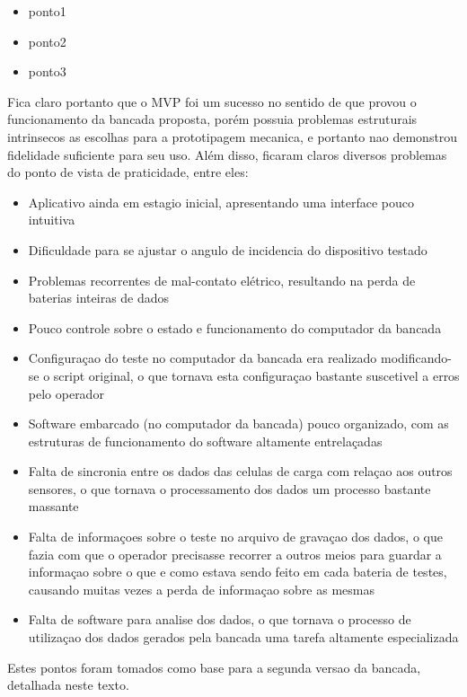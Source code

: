 \begin{itemize}
    \item ponto1
    \item ponto2
    \item ponto3
\end{itemize}

Fica claro portanto que o MVP foi um sucesso no sentido de que provou o funcionamento da bancada proposta, porém possuia problemas estruturais intrinsecos as escolhas para a prototipagem mecanica, e portanto nao demonstrou fidelidade suficiente para seu uso. Além disso, ficaram claros diversos problemas do ponto de vista de praticidade, entre eles:

\begin{itemize}
    \item Aplicativo ainda em estagio inicial, apresentando uma interface pouco intuitiva
    \item Dificuldade para se ajustar o angulo de incidencia do dispositivo testado
    \item Problemas recorrentes de mal-contato elétrico, resultando na perda de baterias inteiras de dados
    \item Pouco controle sobre o estado e funcionamento do computador da bancada
    \item Configuraçao do teste no computador da bancada era realizado modificando-se o script original, o que tornava esta configuraçao bastante suscetivel a erros pelo operador 
    \item Software embarcado (no computador da bancada) pouco organizado, com as estruturas de funcionamento do software altamente entrelaçadas
    \item Falta de sincronia entre os dados das celulas de carga com relaçao aos outros sensores, o que tornava o processamento dos dados um processo bastante massante
    \item Falta de informaçoes sobre o teste no arquivo de gravaçao dos dados, o que fazia com que o operador precisasse recorrer a outros meios para guardar a informaçao sobre o que e como estava sendo feito em cada bateria de testes, causando muitas vezes a perda de informaçao sobre as mesmas
    \item Falta de software para analise dos dados, o que tornava o processo de utilizaçao dos dados gerados pela bancada uma tarefa altamente especializada
\end{itemize}

Estes pontos foram tomados como base para a segunda versao da bancada, detalhada neste texto.

